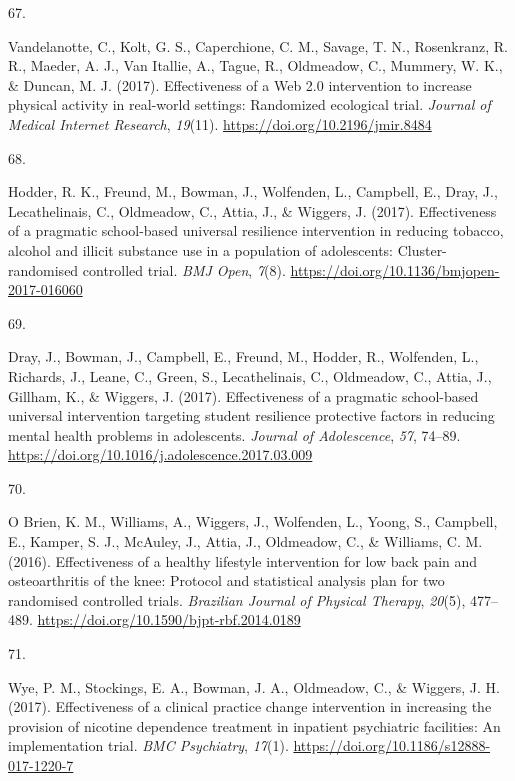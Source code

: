\documentclass[11pt, a4paper]{awesome-cv}
\newlength{\csllabelwidth}
\newcommand{\CSLLeftMargin}[1]{\parbox[t]{\csllabelwidth}{#1}}
\newcommand{\CSLRightInline}[1]{\parbox[t]{\linewidth - \csllabelwidth}{#1}}
\begin{document}
\leavevmode\hypertarget{ref-vandelanotte_effectiveness_2017}{}%
\CSLLeftMargin{67. }
\CSLRightInline{Vandelanotte, C., Kolt, G. S., Caperchione, C. M.,
Savage, T. N., Rosenkranz, R. R., Maeder, A. J., Van Itallie, A., Tague,
R., Oldmeadow, C., Mummery, W. K., \& Duncan, M. J. (2017).
Effectiveness of a Web 2.0 intervention to increase physical activity in
real-world settings: Randomized ecological trial. \emph{Journal of
Medical Internet Research}, \emph{19}(11).
\url{https://doi.org/10.2196/jmir.8484}}

\leavevmode\hypertarget{ref-hodder_effectiveness_2017}{}%
\CSLLeftMargin{68. }
\CSLRightInline{Hodder, R. K., Freund, M., Bowman, J., Wolfenden, L.,
Campbell, E., Dray, J., Lecathelinais, C., Oldmeadow, C., Attia, J., \&
Wiggers, J. (2017). Effectiveness of a pragmatic school-based universal
resilience intervention in reducing tobacco, alcohol and illicit
substance use in a population of adolescents: Cluster-randomised
controlled trial. \emph{BMJ Open}, \emph{7}(8).
\url{https://doi.org/10.1136/bmjopen-2017-016060}}

\leavevmode\hypertarget{ref-dray_effectiveness_2017}{}%
\CSLLeftMargin{69. }
\CSLRightInline{Dray, J., Bowman, J., Campbell, E., Freund, M., Hodder,
R., Wolfenden, L., Richards, J., Leane, C., Green, S., Lecathelinais,
C., Oldmeadow, C., Attia, J., Gillham, K., \& Wiggers, J. (2017).
Effectiveness of a pragmatic school-based universal intervention
targeting student resilience protective factors in reducing mental
health problems in adolescents. \emph{Journal of Adolescence},
\emph{57}, 74--89.
\url{https://doi.org/10.1016/j.adolescence.2017.03.009}}

\leavevmode\hypertarget{ref-o_brien_effectiveness_2016}{}%
\CSLLeftMargin{70. }
\CSLRightInline{O Brien, K. M., Williams, A., Wiggers, J., Wolfenden,
L., Yoong, S., Campbell, E., Kamper, S. J., McAuley, J., Attia, J.,
Oldmeadow, C., \& Williams, C. M. (2016). Effectiveness of a healthy
lifestyle intervention for low back pain and osteoarthritis of the knee:
Protocol and statistical analysis plan for two randomised controlled
trials. \emph{Brazilian Journal of Physical Therapy}, \emph{20}(5),
477--489. \url{https://doi.org/10.1590/bjpt-rbf.2014.0189}}

\leavevmode\hypertarget{ref-wye_effectiveness_2017}{}%
\CSLLeftMargin{71. }
\CSLRightInline{Wye, P. M., Stockings, E. A., Bowman, J. A., Oldmeadow,
C., \& Wiggers, J. H. (2017). Effectiveness of a clinical practice
change intervention in increasing the provision of nicotine dependence
treatment in inpatient psychiatric facilities: An implementation trial.
\emph{BMC Psychiatry}, \emph{17}(1).
\url{https://doi.org/10.1186/s12888-017-1220-7}}
\end{document}

